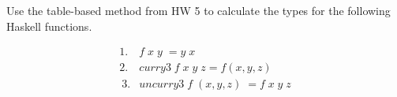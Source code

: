 \documentclass[11pt]{article}
\begin{document}





\begin{problem}
Use the  table-based method from HW 5 to calculate the types for the following Haskell functions.

\[\begin{array}{ll}
1. & f\; x\; y\; = y\; x \\
2. & {\mathit{curry3}}\;f\;x\;y\;z = f(x,y,z)\\\
3. & {\mathit{uncurry3}} \;f\; (x,y,z) \;= f\;x\;y\;z\\
\end{array}\]


\end{problem}
\end{document}
